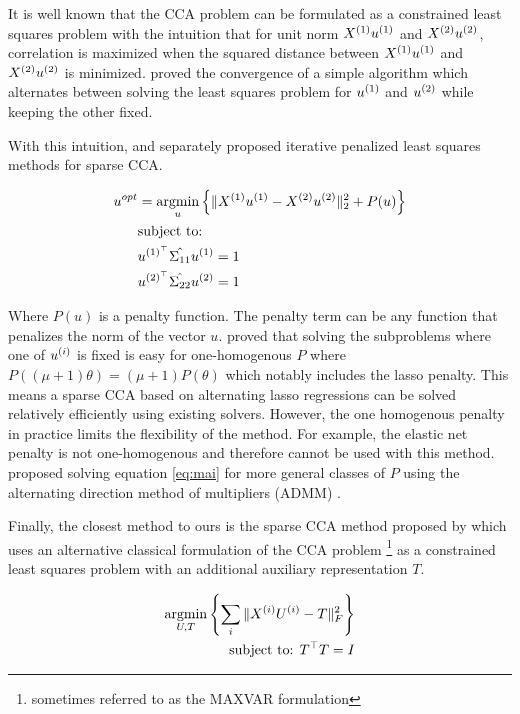 It is well known that the CCA problem can be formulated as a constrained least squares problem with the intuition that
for unit norm \(X^{(1)} u^{(1)}\) and \(X^{(2)} u^{(2)}\), correlation is maximized when the squared distance
between \(X^{(1)} u^{(1)}\) and \(X^{(2)} u^{(2)}\) is minimized. \citep{golub1995canonical} proved the
convergence of a simple algorithm which alternates between solving the least squares problem for \(u^{(1)}\) and
\(u^{(2)}\) while keeping the other fixed.

With this intuition, \citep{wilms2015sparse} and \citep{mai2019iterative} separately proposed iterative penalized least
squares methods for sparse CCA.

\begin{align}
    \label{eq:mai}
    u^{opt} &= \underset{u}{\mathrm{argmin}} \left\{ \|X^{(1)}u^{(1)} - X^{(2)}u^{(2)}\|_2^2 + P(u) \right\} \\
    &\text{subject to:} \notag \\
    &u^{(1)^{\top}} \hat{\Sigma_{11}} u^{(1)}=1 \notag \\
    &u^{(2)^{\top}} \hat{\Sigma_{22}} u^{(2)}=1 \notag
\end{align}

Where \(P(u)\) is a penalty function.
The penalty term can be any function that penalizes the norm of the vector \(u\).
\citep{mai2019iterative} proved that solving the subproblems where one of $u^{(i)}$ is fixed is easy for one-homogenous $P$ where
\( P((\mu + 1)\theta) = (\mu + 1)P(\theta) \) which notably includes the lasso penalty.
This means a sparse CCA based
on alternating lasso regressions can be solved relatively efficiently using existing solvers.
However, the one homogenous penalty in practice limits the flexibility of the method.
For example, the elastic net penalty is not one-homogenous and therefore cannot be used with this method.\citep{
    kanatsoulis2018structured} proposed solving equation \ref{eq:mai} for more general classes of $P$ using the
alternating direction method of multipliers (ADMM) \citep{boyd2011distributed}.

Finally, the closest method to ours is the sparse CCA method proposed by \citep{fu2017scalable} which uses an alternative classical formulation of the CCA problem \footnote{sometimes referred to as the MAXVAR formulation} as a constrained least squares problem with an additional auxiliary representation $T$\citep{carroll1968generalization,kettenring1971canonical}.

\begin{align}\label{eq:fu}
    \underset{U, T}{\mathrm{argmin}}\left\{\sum_i \|X^{(i)} U^{(i)} - T\|_F^2\right\}\\
    \text{subject to: }T^\top T = I\\
\end{align}

